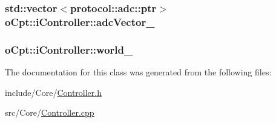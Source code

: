 \subsubsection[{\texorpdfstring{adc\+Vector\+\_\+}{adcVector_}}]{\setlength{\rightskip}{0pt plus 5cm}std\+::vector$<${\bf protocol\+::adc\+::ptr}$>$ o\+Cpt\+::i\+Controller\+::adc\+Vector\+\_\+\hspace{0.3cm}{\ttfamily [protected]}}\hypertarget{classo_cpt_1_1i_controller_ad385bb3078176cd3df8a9e51cfdab68a}{}\label{classo_cpt_1_1i_controller_ad385bb3078176cd3df8a9e51cfdab68a}
\subsubsection[{\texorpdfstring{world\+\_\+}{world_}}]{ o\+Cpt\+::i\+Controller\+::world\+\_\+\hspace{0.3cm}{\ttfamily [protected]}}\hypertarget{classo_cpt_1_1i_controller_a77fe51158891ee7af9d5d92a3ff46b20}{}\label{classo_cpt_1_1i_controller_a77fe51158891ee7af9d5d92a3ff46b20}


The documentation for this class was generated from the following files\+:\begin{DoxyCompactItemize}
\item 
include/\+Core/\hyperlink{_controller_8h}{Controller.\+h}\item 
src/\+Core/\hyperlink{_controller_8cpp}{Controller.\+cpp}\end{DoxyCompactItemize}
